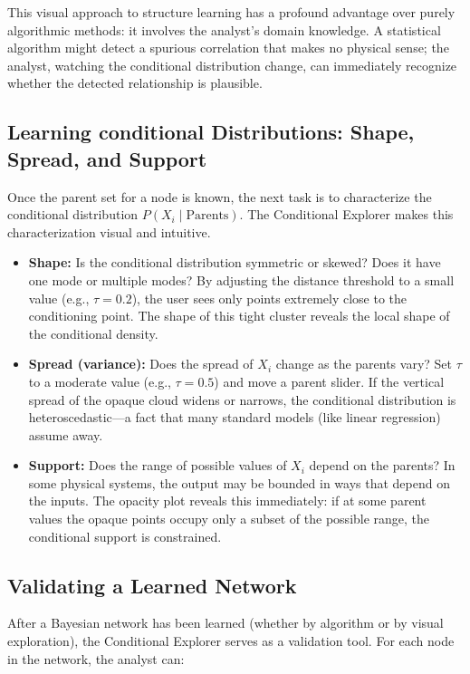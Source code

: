 This visual approach to structure learning has a profound advantage over purely algorithmic methods: it involves the analyst's domain knowledge. A statistical algorithm might detect a spurious correlation that makes no physical sense; the analyst, watching the conditional distribution change, can immediately recognize whether the detected relationship is plausible.

\subsection{Learning conditional Distributions: Shape, Spread, and Support}

Once the parent set for a node is known, the next task is to characterize the conditional distribution \(P(X_i \mid \text{Parents})\). The Conditional Explorer makes this characterization visual and intuitive.

\begin{itemize}
    \item \textbf{Shape:} Is the conditional distribution symmetric or skewed? Does it have one mode or multiple modes? By adjusting the distance threshold to a small value (e.g., \(\tau = 0.2\)), the user sees only points extremely close to the conditioning point. The shape of this tight cluster reveals the local shape of the conditional density.
    \item \textbf{Spread (variance):} Does the spread of \(X_i\) change as the parents vary? Set \(\tau\) to a moderate value (e.g., \(\tau = 0.5\)) and move a parent slider. If the vertical spread of the opaque cloud widens or narrows, the conditional distribution is heteroscedastic—a fact that many standard models (like linear regression) assume away.
    \item \textbf{Support:} Does the range of possible values of \(X_i\) depend on the parents? In some physical systems, the output may be bounded in ways that depend on the inputs. The opacity plot reveals this immediately: if at some parent values the opaque points occupy only a subset of the possible range, the conditional support is constrained.
\end{itemize}

\subsection{Validating a Learned Network}

After a Bayesian network has been learned (whether by algorithm or by visual exploration), the Conditional Explorer serves as a validation tool. For each node in the network, the analyst can:

